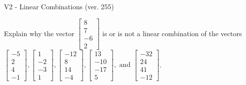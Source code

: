 \begin{exercise}
  \begin{exerciseTitle}V2 - Linear Combinations (ver. 255)\end{exerciseTitle}
  \begin{exerciseStatement}
    Explain why the vector \(\left[\begin{array}{c}
8 \\
7 \\
-6 \\
2
\end{array}\right]\)  is or is not a linear 
	combination of the vectors \(\left[\begin{array}{c}
-5 \\
2 \\
4 \\
-1
\end{array}\right] , \left[\begin{array}{c}
1 \\
-2 \\
-3 \\
1
\end{array}\right] , \left[\begin{array}{c}
-12 \\
8 \\
14 \\
-4
\end{array}\right] , \left[\begin{array}{c}
13 \\
-10 \\
-17 \\
5
\end{array}\right] , \text{ and } \left[\begin{array}{c}
-32 \\
24 \\
41 \\
-12
\end{array}\right]\).
	



\end{exerciseStatement}
\end{exercise}
